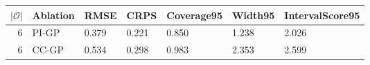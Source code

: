
\begin{tabular}{rllllll}
\toprule
$|\mathcal O|$ & Ablation & RMSE & CRPS & Coverage95 & Width95 & IntervalScore95\\
\midrule
6 & PI-GP & 0.379 & 0.221 & 0.850 & 1.238 & 2.026\\
6 & CC-GP & 0.534 & 0.298 & 0.983 & 2.353 & 2.599\\
\bottomrule
\end{tabular}
